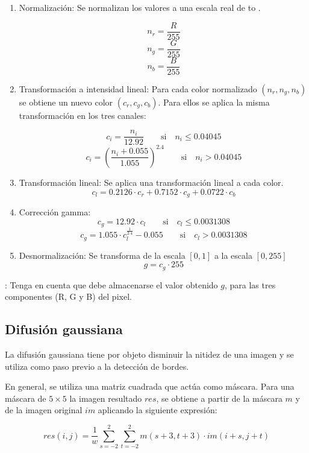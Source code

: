 \begin{enumerate}

\item Normalización: Se normalizan los valores a una escala real de  to .

\[
n_r = \frac{R}{255}
\]
\[
n_g = \frac{G}{255}
\]
\[
n_b = \frac{B}{255}
\]

\item Transformación a intensidad lineal: Para cada color normalizado
$(n_r, n_g, n_b)$ se obtiene un nuevo color $(c_r, c_g, c_b)$.
Para ellos se aplica la misma transformación en los tres canales:

\[
c_i = \frac{n_i}{12.92} \quad\quad \text{si} \quad n_i \leq 0.04045
\]
\[
c_i = \left(\frac{n_i + 0.055}{1.055}\right)^{2.4} \quad\quad \text{si} \quad n_i > 0.04045
\]

\item Transformación lineal: Se aplica una transformación lineal a cada color.
\[
c_l = 0.2126 \cdot c_r + 0.7152 \cdot c_g + 0.0722 \cdot c_b
\]

\item Corrección gamma: 
\[
c_g = 12.92 \cdot c_l \quad\quad \text{si} \quad c_l \leq 0.0031308
\]
\[
c_g = 1.055 \cdot c_l^{\frac{1}{2.4}} - 0.055 \quad\quad \text{si} \quad c_l > 0.0031308
\]

\item Desnormalización: Se transforma de la escala $[0,1]$ a la escala $[0,255]$
\[
g = c_g \cdot 255
\]

\end{enumerate}

:
Tenga en cuenta que debe almacenarse el valor obtenido $g$, para las tres componentes
(R, G y B) del pixel.

\subsection{Difusión gaussiana}

La difusión gaussiana tiene por objeto disminuir la nitidez de una
imagen y se utiliza como paso previo a la detección de bordes.

En general, se utiliza una matriz cuadrada que actúa como máscara.
Para una máscara de $5 \times 5$ la imagen resultado $res$, se obtiene
a partir de la máscara $m$ y de la imagen original $im$ aplicando 
la siguiente expresión:

\[
res(i,j) = \frac{1}{w} \sum_{s=-2}^2 \sum_{t=-2}^2 m(s+3,t+3) \cdot
im(i+s,j+t)
\]

